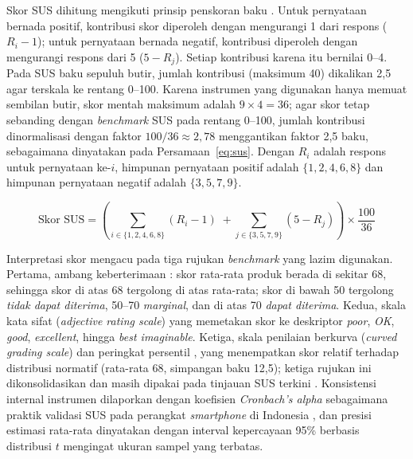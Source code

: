 Skor SUS dihitung mengikuti prinsip penskoran baku \citep{brookeSUSQuick1996}. Untuk pernyataan bernada positif, kontribusi skor diperoleh dengan mengurangi 1 dari respons ($R_i - 1$); untuk pernyataan bernada negatif, kontribusi diperoleh dengan mengurangi respons dari 5 ($5 - R_j$). Setiap kontribusi karena itu bernilai 0--4. Pada SUS baku sepuluh butir, jumlah kontribusi (maksimum 40) dikalikan 2,5 agar terskala ke rentang 0--100. Karena instrumen yang digunakan hanya memuat sembilan butir, skor mentah maksimum adalah $9 \times 4 = 36$; agar skor tetap sebanding dengan \textit{benchmark} SUS pada rentang 0--100, jumlah kontribusi dinormalisasi dengan faktor $100/36 \approx 2{,}78$ menggantikan faktor 2,5 baku, sebagaimana dinyatakan pada Persamaan~\ref{eq:sus}. Dengan $R_i$ adalah respons untuk pernyataan ke-$i$, himpunan pernyataan positif adalah $\{1,2,4,6,8\}$ dan himpunan pernyataan negatif adalah $\{3,5,7,9\}$.

\begin{equation}
\label{eq:sus}
\text{Skor SUS} = \left( \sum_{i \in \{1,2,4,6,8\}} (R_i - 1) \; + \sum_{j \in \{3,5,7,9\}} (5 - R_j) \right) \times \frac{100}{36}
\end{equation}

Interpretasi skor mengacu pada tiga rujukan \textit{benchmark} yang lazim digunakan. Pertama, ambang keberterimaan \citet{bangorDeterminingWhatIndividual2009}: skor rata-rata produk berada di sekitar 68, sehingga skor di atas 68 tergolong di atas rata-rata; skor di bawah 50 tergolong \textit{tidak dapat diterima}, 50--70 \textit{marginal}, dan di atas 70 \textit{dapat diterima}. Kedua, skala kata sifat (\textit{adjective rating scale}) \citet{bangorEmpiricalEvaluation2008} yang memetakan skor ke deskriptor \textit{poor}, \textit{OK}, \textit{good}, \textit{excellent}, hingga \textit{best imaginable}. Ketiga, skala penilaian berkurva (\textit{curved grading scale}) dan peringkat persentil \citet{lewisSauroPastPresent2018}, yang menempatkan skor relatif terhadap distribusi normatif (rata-rata 68, simpangan baku 12,5); ketiga rujukan ini dikonsolidasikan dan masih dipakai pada tinjauan SUS terkini \citep{vlachogianniTseliosPerceivedUsability2022}. Konsistensi internal instrumen dilaporkan dengan koefisien \textit{Cronbach's alpha} sebagaimana praktik validasi SUS pada perangkat \textit{smartphone} di Indonesia \citep{usmanGustalikaPengujianValiditas2022}, dan presisi estimasi rata-rata dinyatakan dengan interval kepercayaan 95\% berbasis distribusi $t$ mengingat ukuran sampel yang terbatas.

